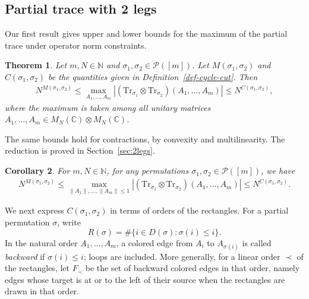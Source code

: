 \documentclass[10pt,a4paper]{amsart}
\numberwithin{equation}{section}
\theoremstyle{plain}
\newtheorem{theorem}{Theorem}[section]
\newtheorem{corollary}[theorem]{Corollary}
\def\bN{\mathbb N}
\def\bC{\mathbb C}
\def\cP{\mathcal P}
\def\Tr{\mathrm {Tr}}
\begin{document}
\subsection{Partial trace with 2 legs}

Our first result gives upper and lower bounds for the maximum of the partial trace under operator norm constraints.


\begin{theorem} \label{Thm-main}
Let $m,N\in\bN$ and $\sigma_1,\sigma_2\in\cP([m])$. Let $M(\sigma_1,\sigma_2)$ and $C(\sigma_1,\sigma_2)$ be the quantities given in Definition~\ref{def-cycle-cut}. Then
\begin{align*}
    N^{M(\sigma_1,\sigma_2)} \le
    \max_{A_1,\ldots,A_m} \left| \left( \Tr_{\sigma_1} \otimes \Tr_{\sigma_2} \right) \left( A_1, \ldots, A_m \right) \right|
    \le N^{C(\sigma_1,\sigma_2)},
\end{align*}
where the maximum is taken among all unitary matrices $A_1, \ldots, A_m \in M_N(\bC) \otimes M_N(\bC)$.
\end{theorem}


The same bounds hold for contractions, by convexity and multilinearity. The reduction is proved in Section~\ref{sec:2legs}.

\begin{corollary} \label{Coro-main-2 leg}
For $m,N \in \bN$, for any permutations $\sigma_1,\sigma_2 \in \cP([m])$, we have
\begin{align*}
    N^{M(\sigma_1,\sigma_2)} \le
    \max_{\|A_1\|,\ldots,\|A_m\| \le 1} \left| \left( \Tr_{\sigma_1} \otimes \Tr_{\sigma_2} \right) \left( A_1, \ldots, A_m \right) \right|
    \le N^{C(\sigma_1,\sigma_2)}.
\end{align*}
\end{corollary}

We next express $C(\sigma_1,\sigma_2)$ in terms of orders of the rectangles. For a partial permutation $\sigma$, write
\[
R(\sigma)=\#\{i\in D(\sigma):\sigma(i)\le i\}.
\]
In the natural order $A_1,\ldots,A_m$, a colored edge from $A_i$ to $A_{\sigma(i)}$ is called \emph{backward} if $\sigma(i)\le i$; loops are included. More generally, for a linear order $\prec$ of the rectangles, let $F_\prec$ be the set of backward colored edges in that order, namely edges whose target is at or to the left of their source when the rectangles are drawn in that order.
\end{document}
